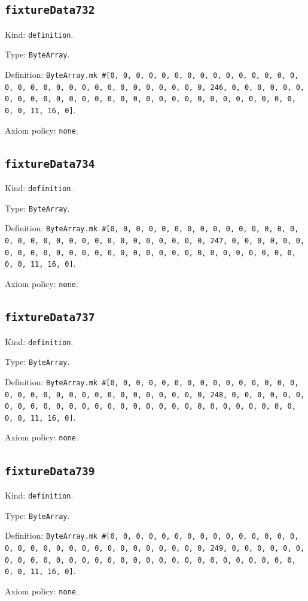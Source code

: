 \documentclass[11pt]{article}
\begin{document}
\subsection*{\texttt{fixtureData732}}
\noindent Kind: \texttt{definition}.\par
\noindent Type: \texttt{ByteArray}.\par
\noindent Definition: \texttt{ByteArray.mk \#[0, 0, 0, 0, 0, 0, 0, 0, 0, 0, 0, 0, 0, 0, 0, 0, 0, 0, 0, 0, 0, 0, 0, 0, 0, 0, 0, 0, 0, 0, 0, 246, 0, 0, 0, 0, 0, 0, 0, 0, 0, 0, 0, 0, 0, 0, 0, 0, 0, 0, 0, 0, 0, 0, 0, 0, 0, 0, 0, 0, 0, 0, 0, 11, 16, 0]}.\par
\noindent Axiom policy: \texttt{none}.\par
\subsection*{\texttt{fixtureData734}}
\noindent Kind: \texttt{definition}.\par
\noindent Type: \texttt{ByteArray}.\par
\noindent Definition: \texttt{ByteArray.mk \#[0, 0, 0, 0, 0, 0, 0, 0, 0, 0, 0, 0, 0, 0, 0, 0, 0, 0, 0, 0, 0, 0, 0, 0, 0, 0, 0, 0, 0, 0, 0, 247, 0, 0, 0, 0, 0, 0, 0, 0, 0, 0, 0, 0, 0, 0, 0, 0, 0, 0, 0, 0, 0, 0, 0, 0, 0, 0, 0, 0, 0, 0, 0, 11, 16, 0]}.\par
\noindent Axiom policy: \texttt{none}.\par
\subsection*{\texttt{fixtureData737}}
\noindent Kind: \texttt{definition}.\par
\noindent Type: \texttt{ByteArray}.\par
\noindent Definition: \texttt{ByteArray.mk \#[0, 0, 0, 0, 0, 0, 0, 0, 0, 0, 0, 0, 0, 0, 0, 0, 0, 0, 0, 0, 0, 0, 0, 0, 0, 0, 0, 0, 0, 0, 0, 248, 0, 0, 0, 0, 0, 0, 0, 0, 0, 0, 0, 0, 0, 0, 0, 0, 0, 0, 0, 0, 0, 0, 0, 0, 0, 0, 0, 0, 0, 0, 0, 11, 16, 0]}.\par
\noindent Axiom policy: \texttt{none}.\par
\subsection*{\texttt{fixtureData739}}
\noindent Kind: \texttt{definition}.\par
\noindent Type: \texttt{ByteArray}.\par
\noindent Definition: \texttt{ByteArray.mk \#[0, 0, 0, 0, 0, 0, 0, 0, 0, 0, 0, 0, 0, 0, 0, 0, 0, 0, 0, 0, 0, 0, 0, 0, 0, 0, 0, 0, 0, 0, 0, 249, 0, 0, 0, 0, 0, 0, 0, 0, 0, 0, 0, 0, 0, 0, 0, 0, 0, 0, 0, 0, 0, 0, 0, 0, 0, 0, 0, 0, 0, 0, 0, 11, 16, 0]}.\par
\noindent Axiom policy: \texttt{none}.\par
\end{document}
